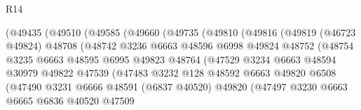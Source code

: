 \begin{lexlean}{R14}
\begin{coremodule}
                        (@49435
                          (@49510
                            (@49585
                              (@49660
                                (@49735
                                  (@49810
                                    (@49816
                                      (@49819
                                        (@46723 @49824)
                                        @48708
                                        (@48742
                                          @3236
                                          @6663
                                          @48596
                                          @6998
                                          @49824
                                          @48752
                                          (@48754
                                            @3235
                                            @6663
                                            @48595
                                            @6995
                                            @49823
                                            @48764
                                            (@47529
                                              @3234
                                              @6663
                                              @48594
                                              @30979
                                              @49822
                                              @47539
                                              (@47483
                                                @3232
                                                @128
                                                @48592
                                                @6663
                                                @49820
                                                @6508
                                                (@47490
                                                  @3231
                                                  @6666
                                                  @48591
                                                  (@6837 @40520)
                                                  @49820
                                                  (@47497
                                                    @3230
                                                    @6663
                                                    @6665
                                                    @6836
                                                    @40520
                                                    @47509

\end{coremodule}
\end{lexlean}
